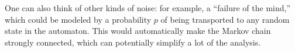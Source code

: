 \documentclass[11pt]{amsart}
\theoremstyle{definition}
\newtheorem{lemma}[theorem]{Lemma}
\theoremstyle{remark}
\begin{document}
    One can also think of other kinds of noise: for example, a ``failure of the mind,'' which could be modeled by a probability $p$ of being transported to any random state in the automaton. This would automatically make the Markov chain strongly connected, which can potentially simplify a lot of the analysis.











\end{document}
